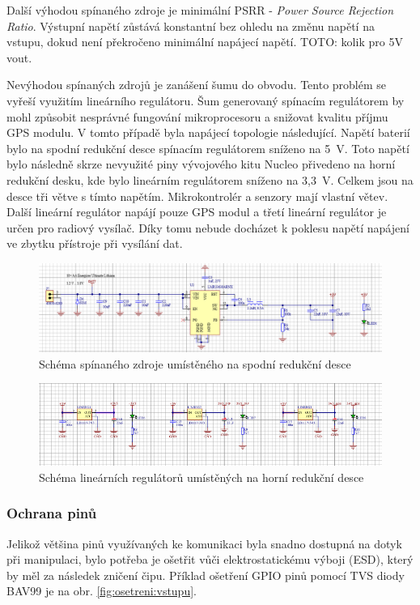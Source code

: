 \documentclass[twoside]{ctuthesis}
\theoremstyle{plain}
\theoremstyle{definition}
\theoremstyle{note}
\begin{document}
			Další výhodou spínaného zdroje je minimální PSRR - \textit{Power Source Rejection Ratio}. Výstupní napětí zůstává konstantní bez ohledu na změnu napětí na vstupu, dokud není překročeno minimální napájecí napětí. TOTO: kolik pro 5V vout. 
			
			Nevýhodou spínaných zdrojů je zanášení šumu do obvodu. Tento problém se vyřeší využitím lineárního regulátoru. Šum generovaný spínacím regulátorem by mohl způsobit nesprávné fungování mikroprocesoru a snižovat kvalitu příjmu GPS modulu. V tomto případě byla napájecí topologie následující. Napětí baterií bylo na spodní redukční desce spínacím regulátorem sníženo na 5~V. Toto napětí bylo následně skrze nevyužité piny vývojového kitu Nucleo přivedeno na horní redukční desku, kde bylo lineárním regulátorem sníženo na 3,3~V. Celkem jsou na desce tři větve s tímto napětím. Mikrokontrolér a senzory mají vlastní větev. Další lineární regulátor napájí pouze GPS modul a třetí lineární regulátor je určen pro radiový vysílač. Díky tomu nebude docházet k poklesu napětí napájení ve zbytku přístroje při vysílání dat. 

			\begin{figure}
				\centering
				\includegraphics[width = \textwidth]{Figures/psu_bot.png}
				\caption{Schéma spínaného zdroje umístěného na spodní redukční desce}
				\label{fig:psu:bot}
			\end{figure}
			\begin{figure}
				\centering
				\includegraphics[width = \textwidth]{Figures/psu_top.png}
				\caption{Schéma lineárních regulátorů umístěných na horní redukční desce}
				\label{fig:psu:top}
			\end{figure}


			\subsubsection{Ochrana pinů}
			Jelikož většina pinů využívaných ke komunikaci byla snadno dostupná na dotyk při manipulaci, bylo potřeba je ošetřit vůči elektrostatickému výboji (ESD), který by měl za následek zničení čipu. Příklad ošetření GPIO pinů pomocí TVS diody BAV99 je na obr. \ref{fig:osetreni:vstupu}.
			
\end{document}
